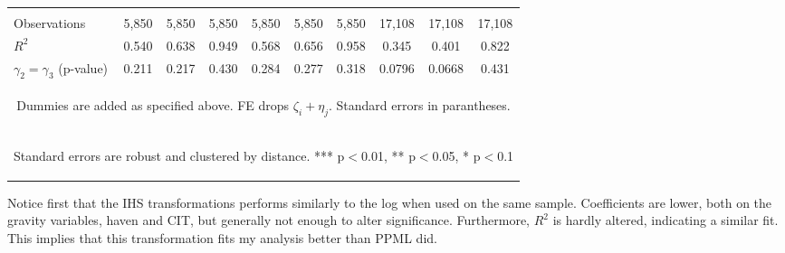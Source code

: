 \documentclass[twoside,a4paper,11pt]{article}
\begin{document}
\begin{table}
{\begin{tabular}{lccc|ccc|ccc}
		\vspace{4pt} & \begin{footnotesize}\end{footnotesize} & \begin{footnotesize}\end{footnotesize} & \begin{footnotesize}\end{footnotesize} & \begin{footnotesize}\end{footnotesize} & \begin{footnotesize}\end{footnotesize} & \begin{footnotesize}\end{footnotesize} & \begin{footnotesize}\end{footnotesize} & \begin{footnotesize}\end{footnotesize} & \begin{footnotesize}\end{footnotesize} \\
		Observations & 5,850 & 5,850 & 5,850 & 5,850 & 5,850 & 5,850 & 17,108 & 17,108 & 17,108 \\
		$R^2$ & 0.540 & 0.638 & 0.949 & 0.568 & 0.656 & 0.958 & 0.345 & 0.401 & 0.822 \\
		$\gamma_2=\gamma_3 $ (p-value) & 0.211 & 0.217 & 0.430 & 0.284 & 0.277 & 0.318 & 0.0796 & 0.0668 & 0.431 \\ \hline
		\multicolumn{10}{c}{\begin{footnotesize} Dummies are added as specified above. FE drops $\zeta_i+\eta_j$. Standard errors in parantheses.\end{footnotesize}} \\
		\multicolumn{10}{c}{\begin{footnotesize} Standard errors are robust and clustered by distance. *** p$<$0.01, ** p$<$0.05, * p$<$0.1\end{footnotesize}} \\
	\end{tabular}
	}
\end{table}

Notice first that the IHS transformations performs similarly to the log when used on the same sample. Coefficients are lower, both on the gravity variables, haven and CIT, but generally not enough to alter significance. Furthermore, $ R^2 $ is hardly altered, indicating a similar fit. This implies that this transformation fits my analysis better than PPML did. 
\end{document}

